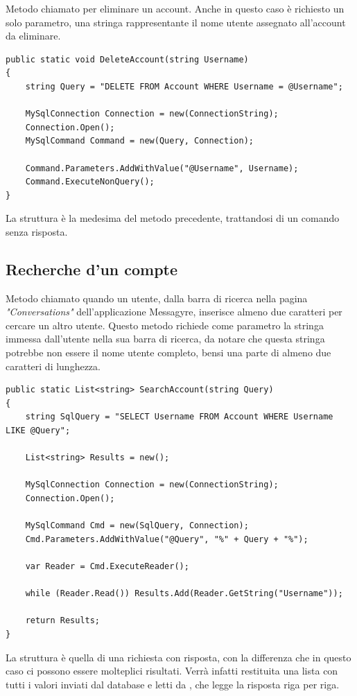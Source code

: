 \documentclass[12pt]{report}
\begin{document}
Metodo chiamato per eliminare un account. Anche in questo caso è richiesto un solo parametro, una stringa  rappresentante il nome utente assegnato all'account da eliminare. 

\begin{verbatim}
public static void DeleteAccount(string Username)
{
	string Query = "DELETE FROM Account WHERE Username = @Username";
	
	MySqlConnection Connection = new(ConnectionString);
	Connection.Open();
	MySqlCommand Command = new(Query, Connection);
	
	Command.Parameters.AddWithValue("@Username", Username);
	Command.ExecuteNonQuery();
}
\end{verbatim}

La struttura è la medesima del metodo precedente, trattandosi di un comando senza risposta.

\subsection{Recherche d'un compte}

Metodo chiamato quando un utente, dalla barra di ricerca nella pagina \textit{"Conversations"} dell'applicazione Messagyre, inserisce almeno due caratteri per cercare un altro utente.
Questo metodo richiede come parametro la stringa immessa dall'utente nella sua barra di ricerca, da notare che questa stringa potrebbe non essere il nome utente completo, bensi una parte di almeno due caratteri di lunghezza.

\begin{verbatim}
public static List<string> SearchAccount(string Query)
{
	string SqlQuery = "SELECT Username FROM Account WHERE Username LIKE @Query";
	
	List<string> Results = new();
	
	MySqlConnection Connection = new(ConnectionString);
	Connection.Open();
	
	MySqlCommand Cmd = new(SqlQuery, Connection);
	Cmd.Parameters.AddWithValue("@Query", "%" + Query + "%");
	
	var Reader = Cmd.ExecuteReader();
	
	while (Reader.Read()) Results.Add(Reader.GetString("Username"));
	
	return Results;
}
\end{verbatim}

La struttura è quella di una richiesta con risposta, con la differenza che in questo caso ci possono essere molteplici risultati. Verrà infatti restituita una lista  con tutti i valori inviati dal database e letti da , che legge la risposta riga per riga.
\end{document}

